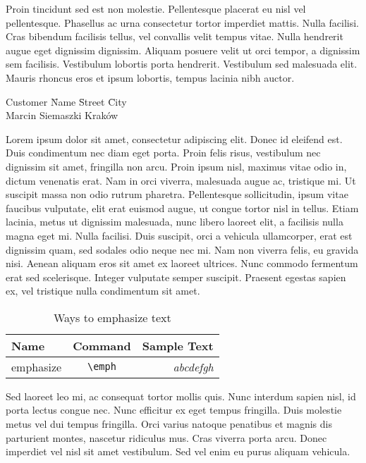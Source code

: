 \documentclass[a4paper,10pt]{book}
\begin{document}
Proin tincidunt sed est non molestie. Pellentesque placerat eu nisl vel pellentesque. Phasellus ac urna consectetur tortor imperdiet mattis. Nulla facilisi. Cras bibendum facilisis tellus, vel convallis velit tempus vitae. Nulla hendrerit augue eget dignissim dignissim. Aliquam posuere velit ut orci tempor, a dignissim sem facilisis. Vestibulum lobortis porta hendrerit. Vestibulum sed malesuada elit. Mauris rhoncus eros et ipsum lobortis, tempus lacinia nibh auctor. 

\begin{tabbing}

Customer \= Name \hspace*{1.5cm} \= Street \hspace*{1.5cm} \= City \\
	\> Marcin \> Siemaszki \> Kraków

\end{tabbing}

Lorem ipsum dolor sit amet, consectetur adipiscing elit. Donec id eleifend est. Duis condimentum nec diam eget porta. Proin felis risus, vestibulum nec dignissim sit amet, fringilla non arcu. Proin ipsum nisl, maximus vitae odio in, dictum venenatis erat. Nam in orci viverra, malesuada augue ac, tristique mi. Ut suscipit massa non odio rutrum pharetra. Pellentesque sollicitudin, ipsum vitae faucibus vulputate, elit erat euismod augue, ut congue tortor nisl in tellus. Etiam lacinia, metus ut dignissim malesuada, nunc libero laoreet elit, a facilisis nulla magna eget mi. Nulla facilisi. Duis suscipit, orci a vehicula ullamcorper, erat est dignissim quam, sed sodales odio neque nec mi. Nam non viverra felis, eu gravida nisi. Aenean aliquam eros sit amet ex laoreet ultrices. Nunc commodo fermentum erat sed scelerisque. Integer vulputate semper suscipit. Praesent egestas sapien ex, vel tristique nulla condimentum sit amet. 

\begin{table}[h!]

\caption{Ways to emphasize text}\label{sec:typheemph}
\begin{tabular}{l|c|r}
\textbf{Name} & \textbf{Command} & \textbf{Sample Text} \\
\hline
emphasize &\verb|\emph| & \emph{abcdefgh}

\end{tabular}

\end{table}



Sed laoreet leo mi, ac consequat tortor mollis quis. Nunc interdum sapien nisl, id porta lectus congue nec. Nunc efficitur ex eget tempus fringilla. Duis molestie metus vel dui tempus fringilla. Orci varius natoque penatibus et magnis dis parturient montes, nascetur ridiculus mus. Cras viverra porta arcu. Donec imperdiet vel nisl sit amet vestibulum. Sed vel enim eu purus aliquam vehicula.
\end{document}
